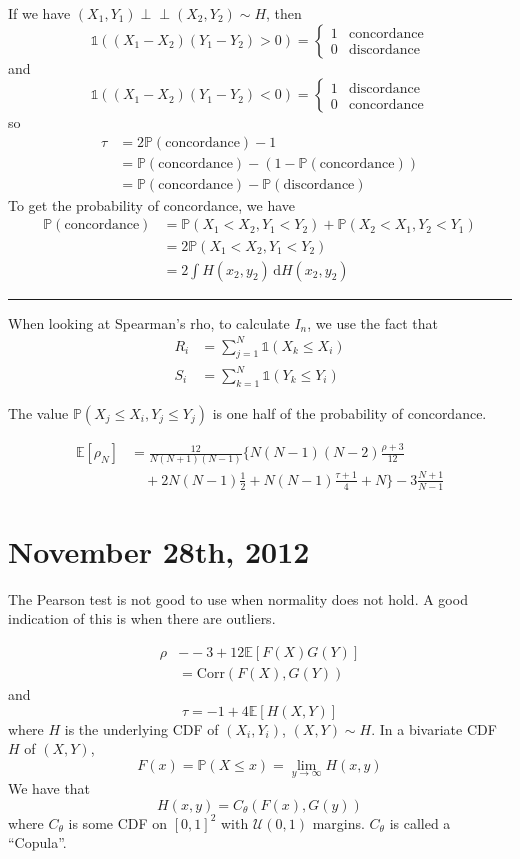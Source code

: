 \documentclass[a4paper,12pt]{amsart}
\newcommand{\sumjN}{\sum_{j=1}^N}
\newcommand{\Corr}{\mbox{Corr}}
\newcommand{\E}[1]{\mathbb{E}\left[#1\right]}
\newcommand{\p}[1]{\mathbb{P}\left(#1\right)}
\newcommand{\indep}{\perp \!\!\! \perp}
\begin{document}
If we have $(X_1,Y_1) \indep (X_2,Y_2) \sim H$, then
\[\mathds{1}((X_1-X_2)(Y_1-Y_2) >0) = \begin{cases}
1 & \text{concordance}\\
0 & \text{discordance}
\end{cases}\]
and
\[\mathds{1}((X_1-X_2)(Y_1-Y_2) <0) = \begin{cases}
1 & \text{discordance}\\
0 & \text{concordance}
\end{cases}\]
so
\begin{align*}
\tau &= 2\p{\text{concordance}}-1\\
&= \p{\text{concordance}} - (1 - \p{\text{concordance}})\\
&= \p{\text{concordance}} - \p{\text{discordance}}
\end{align*}
To get the probability of concordance, we have
\begin{align*}
\p{\text{concordance}} &= \p{X_1<X_2,Y_1<Y_2} + \p{X_2<X_1,Y_2<Y_1}\\
&= 2\p{X_1<X_2,Y_1<Y_2}\\
&= 2 \int \! H(x_2,y_2) \, \mathrm{d}H(x_2,y_2)
\end{align*}

\bigskip
\hrule
\bigskip
When looking at Spearman's rho, to calculate $I_n$, we use the fact that
\begin{align*}
R_i &= \sumjN \mathds{1}(X_k \leq X_i)\\
S_i &= \sum_{k=1}^N \mathds{1}(Y_k \leq Y_i)
\end{align*}

The value $\p{X_j \leq X_i, Y_j \leq Y_j}$ is one half of the probability of concordance.

\begin{align*}
\E{\rho_N} &= \frac{12}{N(N+1)(N-1)}\bigg\{N(N-1)(N-2)\frac{\rho+3}{12}\\
&\quad + 2N(N-1)\frac{1}{2} + N(N-1)\frac{\tau+1}{4} + N \bigg\} - 3\frac{N+1}{N-1}
\end{align*}


\section{November 28th, 2012}
The Pearson test is not good to use when normality does not hold. A good indication of this is when there are outliers.

\begin{align*}
\rho &- -3 + 12 \E{F(X)G(Y)}\\
&= \Corr(F(X),G(Y))
\end{align*}
and
\[\tau = -1 + 4 \E{H(X,Y)}\]
where $H$ is the underlying CDF of $(X_i,Y_i)$, $(X,Y) \sim H$. In a bivariate CDF $H$ of $(X,Y)$, 
\[F(x) = \p{X\leq x} = \lim_{y \to \infty} H(x,y)\]
We have that
\[H(x,y) = C_\theta(F(x),G(y))\]
where $C_\theta$ is some CDF on $[0,1]^2$ with $\mathcal{U}(0,1)$ margins. $C_\theta$ is called a ``Copula''. 
\end{document}
